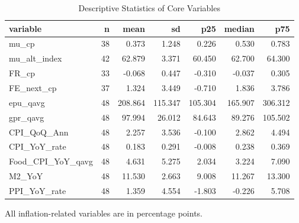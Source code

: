 \begin{table}[!htbp]
\centering
\caption{Descriptive Statistics of Core Variables}
\label{tab:desc_stats}
\begin{threeparttable}

\begin{tabular}{lrrrrrr}
\toprule
variable & n & mean & sd & p25 & median & p75\\
\midrule
mu\_cp & 38 & 0.373 & 1.248 & 0.226 & 0.530 & 0.783\\
mu\_alt\_index & 42 & 62.879 & 3.371 & 60.450 & 62.700 & 64.300\\
FR\_cp & 33 & -0.068 & 0.447 & -0.310 & -0.037 & 0.305\\
FE\_next\_cp & 37 & 1.324 & 3.449 & -0.710 & 1.836 & 3.786\\
epu\_qavg & 48 & 208.864 & 115.347 & 105.304 & 165.907 & 306.312\\
\addlinespace
gpr\_qavg & 48 & 97.994 & 26.012 & 84.643 & 89.276 & 105.502\\
CPI\_QoQ\_Ann & 48 & 2.257 & 3.536 & -0.100 & 2.862 & 4.494\\
CPI\_YoY\_rate & 48 & 0.183 & 0.291 & -0.008 & 0.238 & 0.369\\
Food\_CPI\_YoY\_qavg & 48 & 4.631 & 5.275 & 2.034 & 3.224 & 7.090\\
M2\_YoY & 48 & 11.530 & 2.663 & 9.008 & 11.267 & 13.300\\
\addlinespace
PPI\_YoY\_rate & 48 & 1.359 & 4.554 & -1.803 & -0.226 & 5.708\\
\bottomrule
\end{tabular}
\begin{tablenotes}[flushleft]
\footnotesize
\item All inflation-related variables are in percentage points.
\end{tablenotes}
\end{threeparttable}
\end{table}
